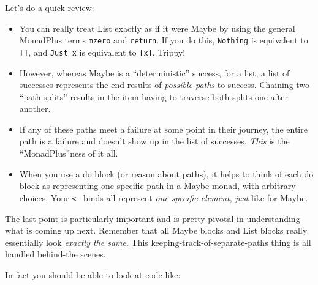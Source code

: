 \documentclass[]{article}
\newenvironment{Shaded}{}{}
\newcommand{\CommentTok}[1]{\textcolor[rgb]{0.38,0.63,0.69}{\textit{#1}}}
\newcommand{\DataTypeTok}[1]{\textcolor[rgb]{0.56,0.13,0.00}{#1}}
\newcommand{\DecValTok}[1]{\textcolor[rgb]{0.25,0.63,0.44}{#1}}
\newcommand{\FunctionTok}[1]{\textcolor[rgb]{0.02,0.16,0.49}{#1}}
\newcommand{\KeywordTok}[1]{\textcolor[rgb]{0.00,0.44,0.13}{\textbf{#1}}}
\newcommand{\NormalTok}[1]{#1}
\newcommand{\OperatorTok}[1]{\textcolor[rgb]{0.40,0.40,0.40}{#1}}
\newcommand{\OtherTok}[1]{\textcolor[rgb]{0.00,0.44,0.13}{#1}}
\begin{document}
Let's do a quick review:

\begin{itemize}
\tightlist
\item
  You can really treat List exactly as if it were Maybe by using the general
  MonadPlus terms \texttt{mzero} and \texttt{return}. If you do this,
  \texttt{Nothing} is equivalent to \texttt{{[}{]}}, and \texttt{Just\ x} is
  equivalent to \texttt{{[}x{]}}. Trippy!
\item
  However, whereas Maybe is a ``deterministic'' success, for a list, a list of
  successes represents the end results of \emph{possible paths} to success.
  Chaining two ``path splits'' results in the item having to traverse both
  splits one after another.
\item
  If any of these paths meet a failure at some point in their journey, the
  entire path is a failure and doesn't show up in the list of successes.
  \emph{This} is the ``MonadPlus''ness of it all.
\item
  When you use a do block (or reason about paths), it helps to think of each do
  block as representing one specific path in a Maybe monad, with arbitrary
  choices. Your \texttt{\textless{}-} binds all represent \emph{one specific
  element}, \emph{just} like for Maybe.
\end{itemize}

The last point is particularly important and is pretty pivotal in understanding
what is coming up next. Remember that all Maybe blocks and List blocks really
essentially look \emph{exactly the same}. This keeping-track-of-separate-paths
thing is all handled behind-the scenes.

In fact you should be able to look at code like:

\begin{Shaded}
\end{Shaded}
\end{document}
